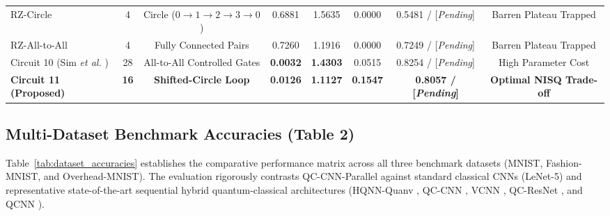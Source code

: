 \documentclass[pdflatex,sn-mathphys-num]{sn-jnl}%
\theoremstyle{thmstyleone}%
\theoremstyle{thmstyletwo}%
\theoremstyle{thmstylethree}%
\begin{document}
\begin{table}[htbp]
{\begin{tabular}{lccccccc}
RZ-Circle & 4 & Circle ($0 \to 1 \to 2 \to 3 \to 0$) & 0.6881 & 1.5635 & 0.0000 & 0.5481 / [\textit{Pending}] & Barren Plateau Trapped \\
RZ-All-to-All & 4 & Fully Connected Pairs & 0.7260 & 1.1916 & 0.0000 & 0.7249 / [\textit{Pending}] & Barren Plateau Trapped \\
Circuit 10 (Sim \textit{et al.} \cite{sim2019expressibility}) & 28 & All-to-All Controlled Gates & \textbf{0.0032} & \textbf{1.4303} & 0.0515 & 0.8254 / [\textit{Pending}] & High Parameter Cost \\
\textbf{Circuit 11 (Proposed)} & \textbf{16} & \textbf{Shifted-Circle Loop} & \textbf{0.0126} & \textbf{1.1127} & \textbf{0.1547} & \textbf{0.8057 / [\textit{Pending}]} & \textbf{Optimal NISQ Trade-off} \\
\bottomrule
\end{tabular}
}
\end{table}

\subsection{Multi-Dataset Benchmark Accuracies (Table 2)}
\label{subsec:multi_dataset_benchmark}

Table~\ref{tab:dataset_accuracies} establishes the comparative performance matrix across all three benchmark datasets (MNIST, Fashion-MNIST, and Overhead-MNIST). The evaluation rigorously contrasts QC-CNN-Parallel against standard classical CNNs (LeNet-5) and representative state-of-the-art sequential hybrid quantum-classical architectures (HQNN-Quanv \cite{senokosov2024quantum}, QC-CNN \cite{henderson2020quanvolutional}, VCNN \cite{huang2021experimental}, QC-ResNet \cite{kashif2024resqnets}, and QCNN \cite{chen2023qcnn}).
\end{document}
